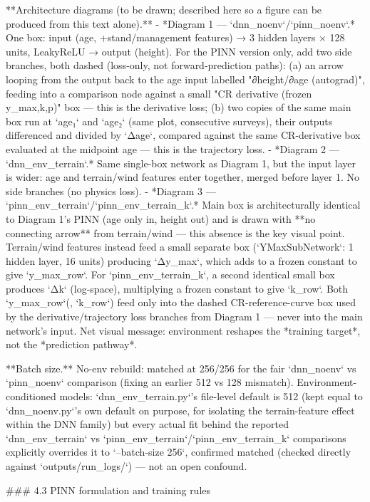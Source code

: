 \documentclass[11pt,a4paper]{report}
\begin{document}
**Architecture diagrams (to be drawn; described here so a figure can be produced from this text alone).**
- *Diagram 1 — `dnn_noenv`/`pinn_noenv`.* One box: input (age, +stand/management features) → 3 hidden layers × 128 units, LeakyReLU → output (height). For the PINN version only, add two side branches, both dashed (loss-only, not forward-prediction paths): (a) an arrow looping from the output back to the age input labelled "∂height/∂age (autograd)", feeding into a comparison node against a small "CR derivative (frozen y_max,k,p)" box — this is the derivative loss; (b) two copies of the same main box run at `age₁` and `age₂` (same plot, consecutive surveys), their outputs differenced and divided by `Δage`, compared against the same CR-derivative box evaluated at the midpoint age — this is the trajectory loss.
- *Diagram 2 — `dnn_env_terrain`.* Same single-box network as Diagram 1, but the input layer is wider: age and terrain/wind features enter together, merged before layer 1. No side branches (no physics loss).
- *Diagram 3 — `pinn_env_terrain`/`pinn_env_terrain_k`.* Main box is architecturally identical to Diagram 1's PINN (age only in, height out) and is drawn with **no connecting arrow** from terrain/wind — this absence is the key visual point. Terrain/wind features instead feed a small separate box (`YMaxSubNetwork`: 1 hidden layer, 16 units) producing `Δy_max`, which adds to a frozen constant to give `y_max_row`. For `pinn_env_terrain_k`, a second identical small box produces `Δk` (log-space), multiplying a frozen constant to give `k_row`. Both `y_max_row`(, `k_row`) feed only into the dashed CR-reference-curve box used by the derivative/trajectory loss branches from Diagram 1 — never into the main network's input. Net visual message: environment reshapes the *training target*, not the *prediction pathway*.

**Batch size.** No-env rebuild: matched at 256/256 for the fair `dnn_noenv` vs `pinn_noenv` comparison (fixing an earlier 512 vs 128 mismatch). Environment-conditioned models: `dnn_env_terrain.py`'s file-level default is 512 (kept equal to `dnn_noenv.py`'s own default on purpose, for isolating the terrain-feature effect within the DNN family) but every actual fit behind the reported `dnn_env_terrain` vs `pinn_env_terrain`/`pinn_env_terrain_k` comparisons explicitly overrides it to `--batch-size 256`, confirmed matched (checked directly against `outputs/run_logs/`) — not an open confound.

### 4.3 PINN formulation and training rules
\end{document}
